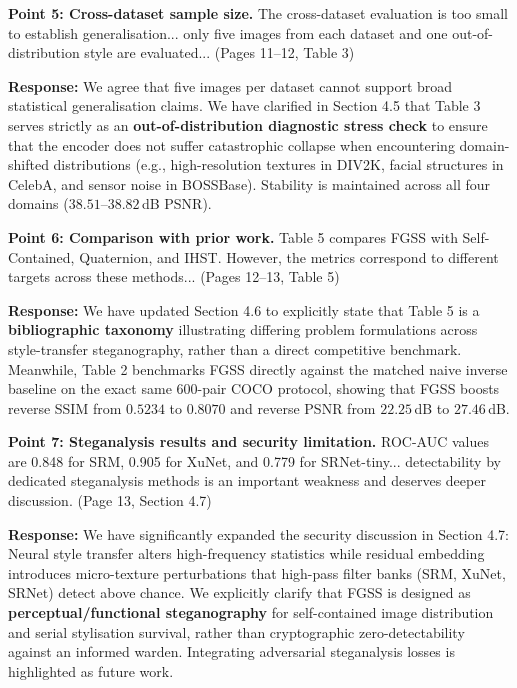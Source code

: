 \documentclass[11pt,a4paper]{article}
\begin{document}
\begin{revcomment}
\textbf{Point 5: Cross-dataset sample size.} The cross-dataset evaluation is too small to establish generalisation... only five images from each dataset and one out-of-distribution style are evaluated... (Pages 11--12, Table 3)
\end{revcomment}

\noindent \textbf{Response:} We agree that five images per dataset cannot support broad statistical generalisation claims. We have clarified in Section 4.5 that Table 3 serves strictly as an \textbf{out-of-distribution diagnostic stress check} to ensure that the encoder does not suffer catastrophic collapse when encountering domain-shifted distributions (e.g., high-resolution textures in DIV2K, facial structures in CelebA, and sensor noise in BOSSBase). Stability is maintained across all four domains ($38.51$--$38.82$\,dB PSNR).

\begin{revcomment}
\textbf{Point 6: Comparison with prior work.} Table 5 compares FGSS with Self-Contained, Quaternion, and IHST. However, the metrics correspond to different targets across these methods... (Pages 12--13, Table 5)
\end{revcomment}

\noindent \textbf{Response:} We have updated Section 4.6 to explicitly state that Table 5 is a \textbf{bibliographic taxonomy} illustrating differing problem formulations across style-transfer steganography, rather than a direct competitive benchmark. Meanwhile, Table 2 benchmarks FGSS directly against the matched naive inverse baseline on the exact same 600-pair COCO protocol, showing that FGSS boosts reverse SSIM from $0.5234$ to $0.8070$ and reverse PSNR from $22.25$\,dB to $27.46$\,dB.

\begin{revcomment}
\textbf{Point 7: Steganalysis results and security limitation.} ROC-AUC values are 0.848 for SRM, 0.905 for XuNet, and 0.779 for SRNet-tiny... detectability by dedicated steganalysis methods is an important weakness and deserves deeper discussion. (Page 13, Section 4.7)
\end{revcomment}

\noindent \textbf{Response:} We have significantly expanded the security discussion in Section 4.7: Neural style transfer alters high-frequency statistics while residual embedding introduces micro-texture perturbations that high-pass filter banks (SRM, XuNet, SRNet) detect above chance. We explicitly clarify that FGSS is designed as \textbf{perceptual/functional steganography} for self-contained image distribution and serial stylisation survival, rather than cryptographic zero-detectability against an informed warden. Integrating adversarial steganalysis losses is highlighted as future work.
\end{document}
